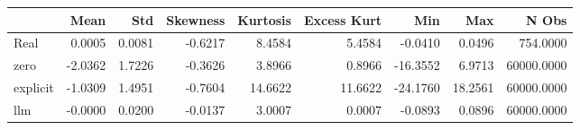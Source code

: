 \begin{tabular}{lrrrrrrrr}
\toprule
 & Mean & Std & Skewness & Kurtosis & Excess Kurt & Min & Max & N Obs \\
\midrule
Real & 0.0005 & 0.0081 & -0.6217 & 8.4584 & 5.4584 & -0.0410 & 0.0496 & 754.0000 \\
zero & -2.0362 & 1.7226 & -0.3626 & 3.8966 & 0.8966 & -16.3552 & 6.9713 & 60000.0000 \\
explicit & -1.0309 & 1.4951 & -0.7604 & 14.6622 & 11.6622 & -24.1760 & 18.2561 & 60000.0000 \\
llm & -0.0000 & 0.0200 & -0.0137 & 3.0007 & 0.0007 & -0.0893 & 0.0896 & 60000.0000 \\
\bottomrule
\end{tabular}
